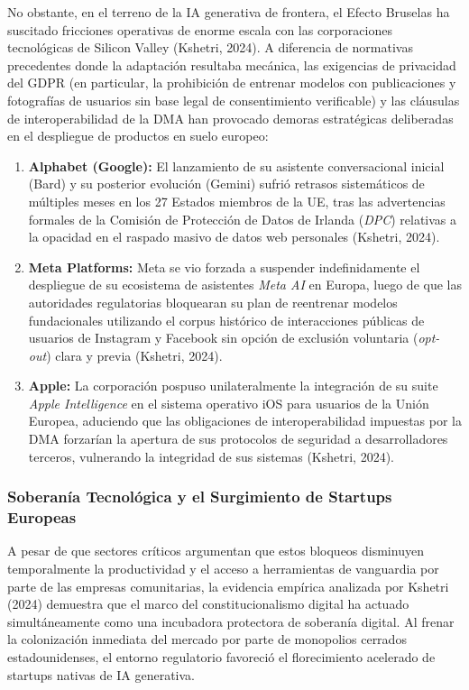 No obstante, en el terreno de la IA generativa de frontera, el Efecto Bruselas ha suscitado fricciones operativas de enorme escala con las corporaciones tecnológicas de Silicon Valley (Kshetri, 2024). A diferencia de normativas precedentes donde la adaptación resultaba mecánica, las exigencias de privacidad del GDPR (en particular, la prohibición de entrenar modelos con publicaciones y fotografías de usuarios sin base legal de consentimiento verificable) y las cláusulas de interoperabilidad de la DMA han provocado demoras estratégicas deliberadas en el despliegue de productos en suelo europeo:
\begin{enumerate}[label=\roman*), leftmargin=2em]
    \item \textbf{Alphabet (Google):} El lanzamiento de su asistente conversacional inicial (Bard) y su posterior evolución (Gemini) sufrió retrasos sistemáticos de múltiples meses en los 27 Estados miembros de la UE, tras las advertencias formales de la Comisión de Protección de Datos de Irlanda (\textit{DPC}) relativas a la opacidad en el raspado masivo de datos web personales (Kshetri, 2024).
    \item \textbf{Meta Platforms:} Meta se vio forzada a suspender indefinidamente el despliegue de su ecosistema de asistentes \textit{Meta AI} en Europa, luego de que las autoridades regulatorias bloquearan su plan de reentrenar modelos fundacionales utilizando el corpus histórico de interacciones públicas de usuarios de Instagram y Facebook sin opción de exclusión voluntaria (\textit{opt-out}) clara y previa (Kshetri, 2024).
    \item \textbf{Apple:} La corporación pospuso unilateralmente la integración de su suite \textit{Apple Intelligence} en el sistema operativo iOS para usuarios de la Unión Europea, aduciendo que las obligaciones de interoperabilidad impuestas por la DMA forzarían la apertura de sus protocolos de seguridad a desarrolladores terceros, vulnerando la integridad de sus sistemas (Kshetri, 2024).
\end{enumerate}

\subsubsection{Soberanía Tecnológica y el Surgimiento de Startups Europeas}

A pesar de que sectores críticos argumentan que estos bloqueos disminuyen temporalmente la productividad y el acceso a herramientas de vanguardia por parte de las empresas comunitarias, la evidencia empírica analizada por Kshetri (2024) demuestra que el marco del constitucionalismo digital ha actuado simultáneamente como una incubadora protectora de soberanía digital. Al frenar la colonización inmediata del mercado por parte de monopolios cerrados estadounidenses, el entorno regulatorio favoreció el florecimiento acelerado de startups nativas de IA generativa.

